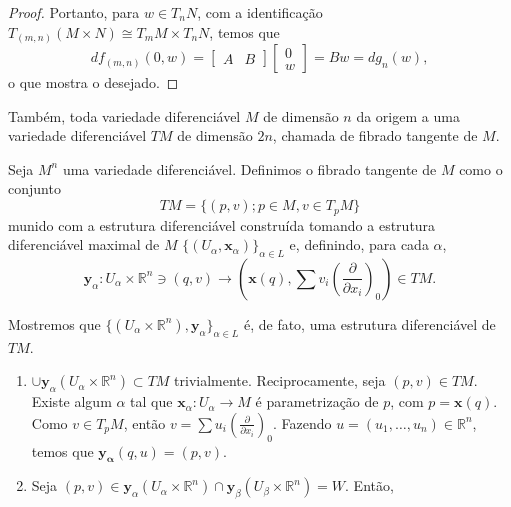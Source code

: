 \begin{lemma}
\begin{proof}
			Portanto, para $w\in T_nN$, com a identificação $T_{(m,n)}(M\times N)\cong T_mM\times T_nN$, temos que
			\begin{equation*}
				df_{(m,n)}(0,w)=\begin{bmatrix} A & B \end{bmatrix}\begin{bmatrix} 0 \\ w \end{bmatrix}=Bw=dg_{n}(w),
			\end{equation*}
			o que mostra o desejado.
		\end{proof}
	\end{lemma}
	Também, toda variedade diferenciável $M$ de dimensão $n$ da origem a uma variedade diferenciável $TM$ de dimensão $2n$, chamada de fibrado tangente de $M$.
	\begin{definition}
		\label{def:fibrado-tangente}
		Seja $M^{n}$ uma variedade diferenciável. Definimos o fibrado tangente de $M$ como o conjunto
		\begin{equation*}
			TM=\{ (p, v); p \in M, v \in T_{p}M \}
		\end{equation*}
		munido com a estrutura diferenciável construída tomando a estrutura diferenciável maximal de $M$ $\{ (U_{\alpha}, \mathbf{x}_{\alpha}) \}_{\alpha \in L}$ e, definindo, para cada $\alpha$,
		\begin{equation*}
			\mathbf{y}_{\alpha}:U_{\alpha}\times \mathbb{R}^{n} \ni (q, v) \to \left( \mathbf{x}(q), \sum v_{i}\left( \frac{\partial}{\partial x_{i}} \right)_{0} \right) \in TM.
		\end{equation*}
	\end{definition}
	Mostremos que $\{ (U_{\alpha}\times \mathbb{R}^{n}), \mathbf{y}_{\alpha} \}_{\alpha \in L}$ é, de fato, uma estrutura diferenciável de $TM$.
	\begin{enumerate}[label=(\roman*)]
		\item $\cup \mathbf{y}_{\alpha}(U_{\alpha}\times \mathbb{R}^{n}) \subset TM$ trivialmente. Reciprocamente, seja $(p, v) \in TM$. Existe algum $\alpha$ tal que $\mathbf{x}_{\alpha}:U_{\alpha}\to M$ é parametrização de $p$, com $p=\mathbf{x}(q)$. Como $v \in T_{p}M$, então $v=\sum u_{i}\left( \frac{\partial}{\partial x_{i}} \right)_{0}$. Fazendo $u=(u_{1}, \dots, u_{n}) \in \mathbb{R}^{n}$, temos que $\mathbf{y_{\alpha}}(q, u)= (p, v)$.
		\item Seja $(p, v) \in \mathbf{y}_{\alpha}(U_{\alpha}\times \mathbb{R}^{n}) \cap \mathbf{y}_{\beta}(U_{\beta}\times \mathbb{R}^{n})=W$. Então,
	\end{enumerate}
